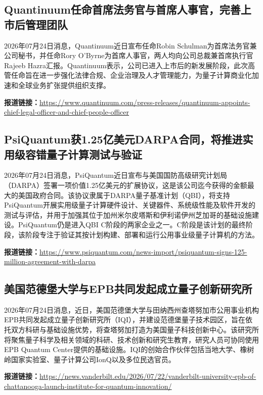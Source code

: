 \documentclass[12pt,a4paper]{ctexart}
\begin{document}
\subsection{ Quantinuum任命首席法务官与首席人事官，完善上市后管理团队 }

2026年07月24日消息，Quantinuum近日宣布任命Robin Schulman为首席法务官兼公司秘书，并任命Rory O’Byrne为首席人事官，两人均向公司总裁兼首席执行官Rajeeb Hazra汇报。Quantinuum表示，公司已进入上市后的新发展阶段，此次高管任命旨在进一步强化法律合规、企业治理及人才管理能力，为量子计算商业化加速和全球业务扩张提供组织支撑。

\noindent\textbf{报道链接：}\url{https://www.quantinuum.com/press-releases/quantinuum-appoints-chief-legal-officer-and-chief-people-officer}

\subsection{ PsiQuantum获1.25亿美元DARPA合同，将推进实用级容错量子计算测试与验证 }

2026年07月24日消息，PsiQuantum近日宣布与美国国防高级研究计划局（DARPA）签署一项价值1.25亿美元的扩展协议，这是该公司迄今获得的金额最大的美国政府合同。该协议隶属于DARPA量子基准计划（QBI），将支持PsiQuantum开展实用级量子计算硬件设计、关键器件、系统级性能及软件开发的测试与评估，并用于加强其位于加州米尔皮塔斯和伊利诺伊州芝加哥的基础设施建设。PsiQuantum仍是进入QBI C阶段的两家企业之一。C阶段是该计划的最终阶段，该阶段专注于验证其按计划构建、部署和运行公用事业级量子计算机的方法。

\noindent\textbf{报道链接：}\url{https://www.psiquantum.com/news-import/psiquantum-signs-125-million-agreement-with-darpa}

\subsection{ 美国范德堡大学与EPB共同发起成立量子创新研究所 }

2026年07月24日消息，近日，美国范德堡大学与田纳西州查塔努加市公用事业机构EPB共同发起成立量子创新研究所（IQI），并建设范德堡量子技术园区，旨在依托双方科研与基础设施优势，将查塔努加打造为美国量子科技创新中心。该研究所将聚焦量子科学及相关领域的科研、技术创新和研究生教育，研究人员可协同使用EPB Quantum Center提供的基础设施。IQI的创始合作伙伴包括当地大学、橡树岭国家实验室、量子计算公司IonQ以及多位民选官员。

\noindent\textbf{报道链接：}\url{https://news.vanderbilt.edu/2026/07/22/vanderbilt-university-epb-of-chattanooga-launch-institute-for-quantum-innovation/}
\end{document}
